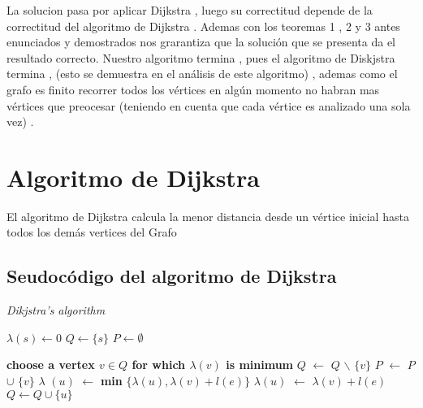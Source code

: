 \documentclass[10pt]{article}
\begin{document}
    \noindent La solucion pasa por aplicar Dijkstra , luego su correctitud depende de la correctitud del algoritmo de Dijkstra . 
    Ademas con los teoremas 1 , 2 y 3  antes enunciados y demostrados nos grarantiza que la soluci\'on que se presenta da el resultado correcto. 
    Nuestro algoritmo termina , pues el algoritmo de Diskjstra termina , (esto se demuestra en el an\'alisis de este algoritmo)  , ademas como el grafo es 
    finito recorrer todos los v\'ertices en alg\'un momento no habran mas v\'ertices que preocesar (teniendo en cuenta que cada v\'ertice es analizado una sola vez)  . 




    \section{Algoritmo de Dijkstra}

    \noindent El algoritmo de Dijkstra calcula la menor distancia desde un v\'ertice inicial hasta todos los dem\'as vertices del Grafo  

    \subsection{Seudoc\'odigo del algoritmo de Dijkstra} 

        \begin{algorithm}[h]
            \caption{\textit{Dikjstra's algorithm}}
            \begin{algorithmic}[1]      
            \State $\lambda \left(s \right) \leftarrow 0 $
            \State $Q \leftarrow \{s\}$
            \State $P \leftarrow \emptyset $

                    \State \textbf{choose a vertex $v \in Q $ for which $\lambda \left(v\right)$ is minimum}
                    \State $Q$ $\leftarrow$ $Q$ $\backslash$ $\{v\}$
                    \State $P$ $\leftarrow$ $P$ $\cup$  $\{v\}$
                            \State $\lambda $ $\left(u\right)$ $\leftarrow $ \textbf{min} $\{ \lambda \left(u\right) , \lambda \left(v\right) + l \left(e\right)\}$ 
                        \Else
                                \State $\lambda\left(u\right)$ $ \leftarrow $ $ \lambda \left(v\right) + l \left(e\right)$
                                \State $ Q \leftarrow  Q \cup \{u\}$
                            \EndIf
                        \EndIf 
                    \EndFor
            \EndWhile 
            \end{algorithmic}
        \end{algorithm}
\end{document}
